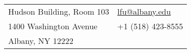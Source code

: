 \documentclass{resume_liang} %
\begin{document}
	
\begin{tabu} to \linewidth {X[l]X[r]}
	Hudson Building, Room 103     &  \href{mailto:lfu@albany.edu}{lfu@albany.edu}  \\
	1400 Washington Avenue        & +1 (518) 423-8555\\
	Albany, NY 12222              & %
\end{tabu}
\bigskip \bigskip









\end{document}
